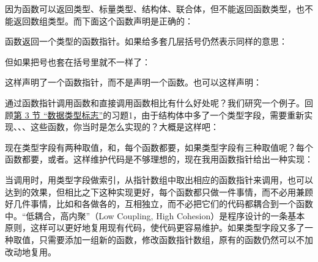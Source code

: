 

因为函数可以返回类型、标量类型、结构体、联合体，但不能返回函数类型，也不能返回数组类型。而下面这个函数声明是正确的：




函数返回一个类型的函数指针。如果给多套几层括号仍然表示同样的意思：




但如果把\BookCode{*}号也套在括号里就不一样了：




这样声明了一个函数指针，而不是声明一个函数。也可以这样声明：




通过函数指针调用函数和直接调用函数相比有什么好处呢？我们研究一个例子。回顾\hyperlink{db.ch07s03.id2731288}{第 3 节 “数据类型标志”}的习题1，由于结构体中多了一个类型字段，需要重新实现、、、这些函数，你当时是怎么实现的？大概是这样吧：




现在类型字段有两种取值，和，每个函数都要，如果类型字段有三种取值呢？每个函数都要，或者。这样维护代码是不够理想的，现在我用函数指针给出一种实现：




当调用时，用类型字段做索引，从指针数组中取出相应的函数指针来调用，也可以达到的效果，但相比之下这种实现更好，每个函数都只做一件事情，而不必用兼顾好几件事情，比如和各做各的，互相独立，而不必把它们的代码都耦合到一个函数中。“低耦合，高内聚”（Low Coupling, High Cohesion）是程序设计的一条基本原则，这样可以更好地复用现有代码，使代码更容易维护。如果类型字段又多了一种取值，只需要添加一组新的函数，修改函数指针数组，原有的函数仍然可以不加改动地复用。

